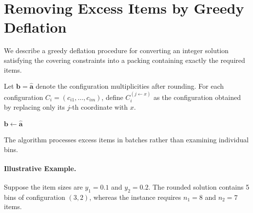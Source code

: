 
\section{Removing Excess Items by Greedy Deflation}
\label{app:greedy-deflation}

We describe a greedy deflation procedure for
converting an integer solution satisfying the
covering constraints into a packing containing
exactly the required items.

Let $\mathbf{b}=\hat{\mathbf{a}}$ denote the
configuration multiplicities after rounding.
For each configuration
$C_i=(c_{i1},\ldots,c_{im})$, define
$C_i^{(j\leftarrow x)}$ as the configuration
obtained by replacing only its $j$-th
coordinate with $x$.

\begin{algorithm}[H]
    \caption{Greedy Deflation}
    \label{alg:greedy-deflation}
    $\mathbf{b} \gets \hat{\mathbf{a}}$\;
    \;
\end{algorithm}

The algorithm processes excess items in batches
rather than examining individual bins.


\paragraph{Illustrative Example.}

Suppose the item sizes are
$y_1=0.1$ and $y_2=0.2$.
The rounded solution contains 5 bins of
configuration $(3,2)$, whereas the instance
requires $n_1=8$ and $n_2=7$ items.

